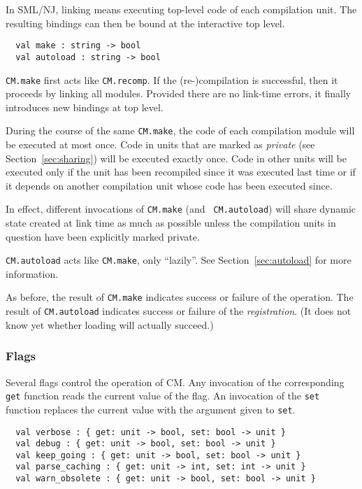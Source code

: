 \documentclass{article}
\begin{document}
In SML/NJ, linking means executing top-level code of each compilation
unit.  The resulting bindings can then be bound at the interactive top
level.

\begin{verbatim}
  val make : string -> bool
  val autoload : string -> bool
\end{verbatim}

{\tt CM.make} first acts like {\tt CM.recomp}.  If the (re-)compilation
is successful, then it proceeds by linking all modules.  Provided
there are no link-time errors, it finally introduces new bindings at
top level.

During the course of the same {\tt CM.make}, the code of each
compilation module will be executed at most once.  Code in units that
are marked as {\it private} (see Section~\ref{sec:sharing}) will be
executed exactly once.  Code in other units will be executed only if
the unit has been recompiled since it was executed last time or if it
depends on another compilation unit whose code has been executed
since.

In effect, different invocations of {\tt CM.make} (and {\tt
CM.autoload}) will share dynamic state created at link time as much as
possible unless the compilation units in question have been explicitly
marked private.

{\tt CM.autoload} acts like {\tt CM.make}, only ``lazily''. See
Section~\ref{sec:autoload} for more information.

As before, the result of {\tt CM.make} indicates success or failure of
the operation.  The result of {\tt CM.autoload} indicates success or
failure of the {\em registration}.  (It does not know yet whether
loading will actually succeed.)

\subsubsection*{Flags}

Several flags control the operation of CM.  Any invocation of the
corresponding {\tt get} function reads the current value of the flag.  An
invocation of the {\tt set} function replaces the current value with
the argument given to {\tt set}.

\begin{verbatim}
  val verbose : { get: unit -> bool, set: bool -> unit }
  val debug : { get: unit -> bool, set: bool -> unit }
  val keep_going : { get: unit -> bool, set: bool -> unit }
  val parse_caching : { get: unit -> int, set: int -> unit }
  val warn_obsolete : { get: unit -> bool, set: bool -> unit }
\end{verbatim}
\end{document}

